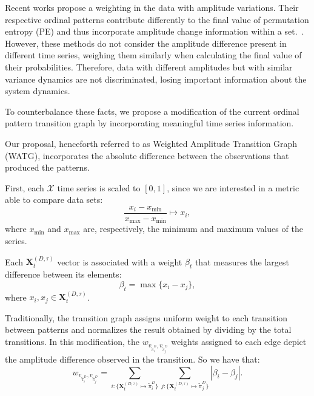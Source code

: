 \documentclass[paper=letter, fontsize=12pt]{article}
\begin{document}
	Recent works propose a weighting in the data with amplitude variations.
	Their respective ordinal patterns contribute differently to the final value of permutation entropy (PE) and thus incorporate amplitude change information within a set.~\cite{Fadlallah2013Weightedpermutation}.
	However, these methods do not consider the amplitude difference present in different time series, weighing them similarly when calculating the final value of their probabilities.
	Therefore, data with different amplitudes but with similar variance dynamics are not discriminated, losing important information about the system dynamics.
	
	To counterbalance these facts, we propose a modification of the current ordinal pattern transition graph by incorporating meaningful time series information.
	
	Our proposal, henceforth referred to as Weighted Amplitude Transition Graph (WATG), incorporates the absolute difference between the observations that produced the patterns.
	
	First, each $\mathcal{X}$ time series is scaled to $[0, 1]$, since we are interested in a metric able to compare data sets:
	\begin{equation}
	\frac{x_i - x_{\min}}{x_{\max} - x_{\min}} \longmapsto x_i,
	\end{equation}
	where $x_{\min}$ and $x_{\max}$ are, respectively, the minimum and maximum values of the series.
	
	Each $\mathbf{X}^{(D, \tau)}_t$ vector is associated with a weight $\beta_t$ that measures the largest difference between its elements:
	\begin{equation}
	\beta_t = \max\{x_i - x_j\},
	\end{equation}
	where $x_i, x_j \in \mathbf{X}^{(D, \tau)}_t$.
	
	Traditionally, the transition graph assigns uniform weight to each transition between patterns and normalizes the result obtained by dividing by the total transitions.
	In this modification, the $w_{v_{\widetilde\pi^D_i}, v_{\widetilde\pi^D_j}}$ weights assigned to each edge depict the amplitude difference observed in the transition.
	So we have that:	
	\begin{equation}
	w_{v_{\widetilde \pi^D_i}, v_{\widetilde \pi^D_j}} =  \sum_{i : \{\mathbf{X}^{(D,\tau)}_t \mapsto \widetilde\pi^D_i\}} \sum_{j : \{\mathbf{X}^{(D,\tau)}_t \mapsto \widetilde\pi^D_j\}} |\beta_i - \beta_j| .
	\end{equation}
	
\end{document}
